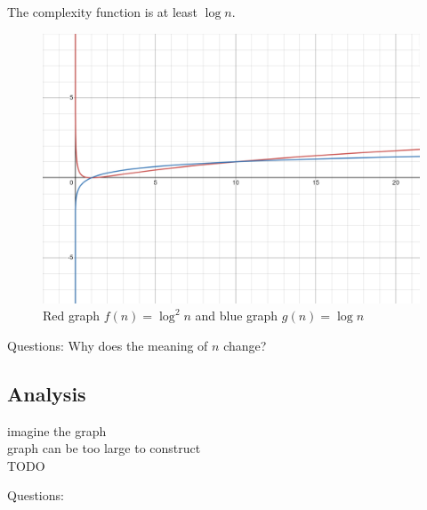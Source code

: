 \documentclass[a4]{scrartcl}
\begin{document}
The complexity function is at least $\log n$.




\begin{figure}[H]
\begin{center}
\includegraphics[scale=0.3]{images/logplot.png}
\caption{Red graph $f(n) = \log ^2 n$ and blue graph $g(n)= \log n$}
\end{center}
\end{figure}



\color{violet} Questions: Why does the meaning of $n$ change?
\color{black}



\subsection*{Analysis}
imagine the graph \\
graph can be too large to construct \\




\color{red} TODO
\color{black}

\color{violet} Questions:
\color{black}















\newpage

\printbibliography
\end{document}

